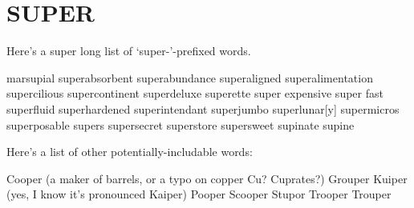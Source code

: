 \section{SUPER}
Here's a super long list of `super-'-prefixed words.

marsupial
superabsorbent
superabundance
superaligned
superalimentation
supercilious
supercontinent
superdeluxe
superette
super expensive
super fast
superfluid
superhardened
superintendant
superjumbo
superlunar[y]
supermicros
superposable
supers
supersecret
superstore
supersweet
supinate
supine

Here's a list of other potentially-includable words:

Cooper (a maker of barrels, or a typo on copper Cu?  Cuprates?)
Grouper
Kuiper (yes, I know it's pronounced Kaiper)
Pooper
Scooper
Stupor
Trooper
Trouper